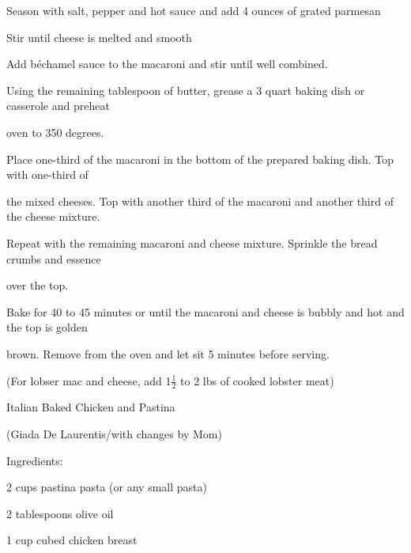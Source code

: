 \documentclass[a4paper,portrait,12pt]{book}
\begin{document}
Season with salt, pepper and hot sauce and add 4 ounces of grated parmesan




Stir until cheese is melted and smooth




Add b\'{e}chamel sauce to the macaroni and stir until well combined.




Using the remaining tablespoon of butter, grease a 3 quart baking dish or casserole and preheat




oven to 350 degrees.




Place one-third of the macaroni in the bottom of the prepared baking dish. Top with one-third of




the mixed cheeses. Top with another third of the macaroni and another third of the cheese mixture.




Repeat with the remaining macaroni and cheese mixture. Sprinkle the bread crumbs and essence




over the top.




Bake for 40 to 45 minutes or until the macaroni and cheese is bubbly and hot and the top is golden




brown. Remove from the oven and let sit 5 minutes before serving.




(For lobser mac and cheese, add 1$\frac{1}{2}$ to 2 lbs of cooked lobster meat)







\newpage
Italian Baked Chicken and Pastina




(Giada De Laurentis/with changes by Mom)




Ingredients:




2 cups pastina pasta (or any small pasta)




2 tablespoons olive oil




1 cup cubed chicken breast
\end{document}
